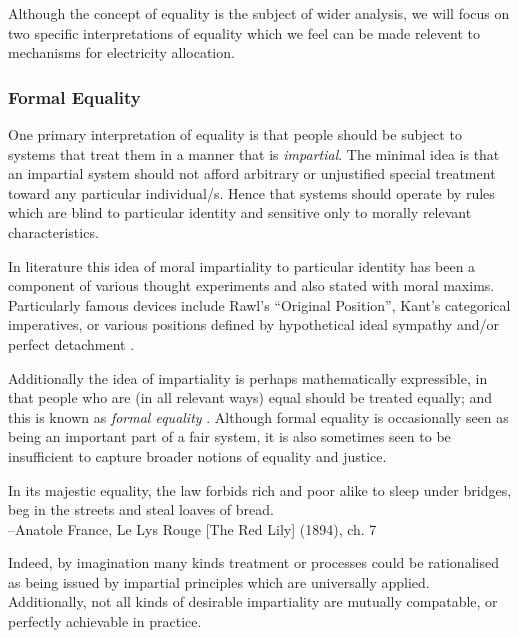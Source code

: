 Although the concept of equality is the subject of wider analysis, we will focus on two specific interpretations of equality which we feel can be made relevent to mechanisms for electricity allocation.

\subsubsection{Formal Equality}\label{sec:formal_equality}

One primary interpretation of equality is that people should be subject to systems that treat them in a manner that is \textit{impartial}. The minimal idea is that an impartial system should not afford arbitrary or unjustified special treatment toward any particular individual/s. Hence that systems should operate by rules which are blind to particular identity and sensitive only to morally relevant characteristics.

In literature this idea of moral impartiality to particular identity has been a component of various thought experiments and also stated with moral maxims.
Particularly famous devices include Rawl's ``Original Position'', Kant's categorical imperatives, or various positions defined by hypothetical ideal sympathy and/or perfect detachment \cite{smithGutenberg, nla.cat-vn197822,10.2307/2103988}.

Additionally the idea of impartiality is perhaps mathematically expressible, in that people who are (in all relevant ways) equal should be treated equally; and this is known as \textit{formal equality} \cite{whatisbasicequalitynathan}. Although formal equality is occasionally seen as being an important part of a fair system, it is also sometimes seen to be insufficient to capture broader notions of equality and justice.

\begin{displayquote}
In its majestic equality, the law forbids rich and poor alike to sleep under bridges, beg in the streets and steal loaves of bread.\\
--Anatole France, Le Lys Rouge [The Red Lily] (1894), ch. 7
\end{displayquote}

Indeed, by imagination many kinds treatment or processes could be rationalised as being issued by impartial principles which are universally applied. Additionally, not all kinds of desirable impartiality are mutually compatable, or perfectly achievable in practice.\cite{Hutchinson_2019}

